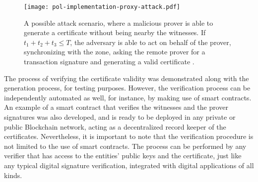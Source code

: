 \begin{figure}[h!]
    \begin{center}
    \texttt{[image: pol-implementation-proxy-attack.pdf]}
    \caption{A possible attack scenario, where a malicious prover is able to generate a \pol{} certificate without being nearby the witnesses. If $t_1 + t_2 + t_3 \leq T$, the adversary is able to act on behalf of the prover, synchronizing with the zone, asking the remote prover for a transaction signature and generating a valid certificate \cite{nosouhi2020blockchain}.}
    \label{fig:pol-implementation:overview-proxy-wormhole}
    \end{center}
\end{figure}

The process of verifying the certificate validity was demonstrated along with the generation process, for testing purposes. However, the verification process can be independently automated as well, for instance, by making use of smart contracts. An example of a smart contract that verifies the witnesses and the prover signatures was also developed, and is ready to be deployed in any private or public Blockchain network, acting as a decentralized record keeper of the \pol{} certificates. Nevertheless, it is important to note that the verification procedure is not limited to the use of smart contracts. The process can be performed by any verifier that has access to the entities' public keys and the \pol{} certificate, just like any typical digital signature verification, integrated with digital applications of all kinds.





